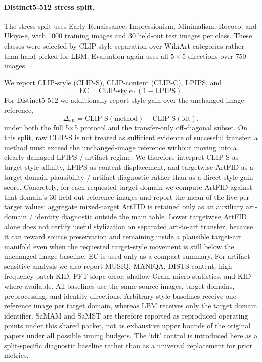 \documentclass[letterpaper]{article}
\begin{document}
\paragraph{Distinct5-512 stress split.}
The stress split uses Early Renaissance, Impressionism, Minimalism, Rococo, and Ukiyo-e, with 1000 training images and 30 held-out test images per class. These classes were selected by CLIP-style separation over WikiArt categories rather than hand-picked for LBM. Evaluation again uses all $5\times5$ directions over 750 images.

We report CLIP-style (CLIP-S), CLIP-content (CLIP-C), LPIPS, and
\begin{equation}
    \mathrm{EC} = \mathrm{CLIP\mbox{-}style}\cdot(1-\mathrm{LPIPS}).
\end{equation}
For Distinct5-512 we additionally report style gain over the unchanged-image reference,
\begin{equation}
    \Delta_{\mathrm{idt}} = \mathrm{CLIP\mbox{-}S}(\text{method}) - \mathrm{CLIP\mbox{-}S}(\text{idt}),
\end{equation}
under both the full 5$\times$5 protocol and the transfer-only off-diagonal subset. On this split, raw CLIP-S is not treated as sufficient evidence of successful transfer: a method must exceed the unchanged-image reference without moving into a clearly damaged LPIPS / artifact regime. We therefore interpret CLIP-S as target-style affinity, LPIPS as content displacement, and targetwise ArtFID as a target-domain plausibility / artifact diagnostic rather than as a direct style-gain score. Concretely, for each requested target domain we compute ArtFID against that domain's 30 held-out reference images and report the mean of the five per-target values; aggregate mixed-target ArtFID is retained only as an auxiliary art-domain / identity diagnostic outside the main table. Lower targetwise ArtFID alone does not certify useful stylization on separated art-to-art transfer, because it can reward source preservation and remaining inside a plausible target-art manifold even when the requested target-style movement is still below the unchanged-image baseline. EC is used only as a compact summary. For artifact-sensitive analysis we also report MUSIQ, MANIQA, DISTS-content, high-frequency patch KID, FFT slope error, shallow Gram micro statistics, and KID where available. All baselines use the same source images, target domains, preprocessing, and identity directions. Arbitrary-style baselines receive one reference image per target domain, whereas LBM receives only the target domain identifier. SaMAM and SaMST are therefore reported as reproduced operating points under this shared packet, not as exhaustive upper bounds of the original papers under all possible tuning budgets. The `idt' control is introduced here as a split-specific diagnostic baseline rather than as a universal replacement for prior metrics.
\end{document}
